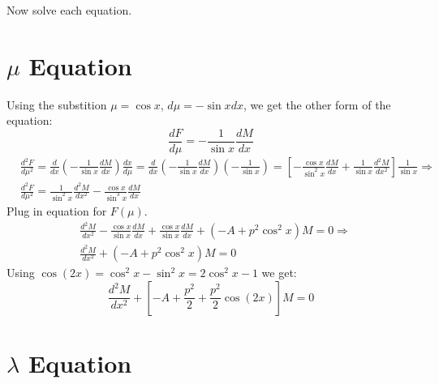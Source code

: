 Now solve each equation.

\section{$ \mu $ Equation}
Using the substition $ \mu = \cos x $, $ d\mu = -\sin x dx $,  we get the other form of the equation:
\begin{equation}
\frac{dF}{d\mu} = -\frac{1}{\sin x}\frac{d M}{d x}
\end{equation}
\begin{equation}
\begin{split}
& \frac{d^2F}{d\mu^2} = \frac{d}{d x}\left(-\frac{1}{\sin x}\frac{d M}{d x}\right)\frac{d x}{d \mu} = \frac{d}{d x}\left(-\frac{1}{\sin x}\frac{d M}{d x}\right)\left(-\frac{1}{\sin x}\right) = \left[-\frac{\cos x}{\sin^2 x}\frac{d M}{d x} + \frac{1}{\sin x}\frac{d^2 M}{d x^2}\right]\frac{1}{\sin x} \Rightarrow \\[.8em]
& \frac{d^2 F}{d\mu^2} = \frac{1}{\sin^2 x}\frac{d^2 M}{d x^2} - \frac{\cos x}{\sin^3 x}\frac{d M}{d x}
\end{split}
\end{equation}
Plug in equation for $ F(\mu) $.
\begin{equation}\label{Feq}
\begin{split}
& \frac{d^2 M}{d x^2} - \frac{\cos x}{\sin x}\frac{d M}{d x} + \frac{\cos x}{\sin x}\frac{d M}{d x} + \left(-A + p^2\cos^2 x\right) M = 0 \Rightarrow \\[.8em]
& \frac{d^2 M}{d x^2} + \left(-A + p^2\cos^2x\right)M = 0
\end{split}
\end{equation}
Using $ \cos(2x) = \cos^2x - \sin^2x = 2\cos^2x - 1 $ we get:
\begin{equation}\label{Feq2}
\frac{d^2 M}{d x^2} + \left[-A + \frac{p^2}{2} + \frac{p^2}{2}\cos(2x) \right]M = 0 
\end{equation}

\section{$ \lambda $ Equation}

